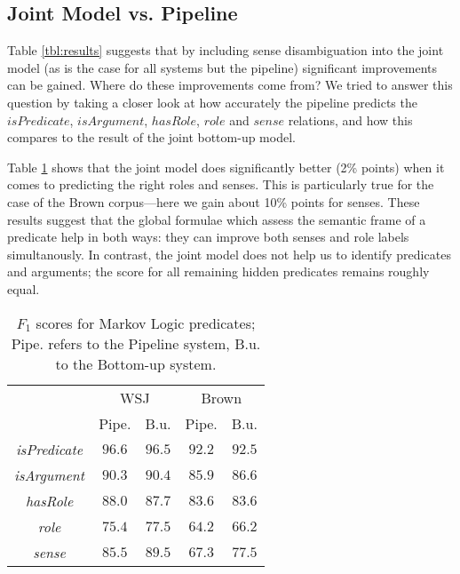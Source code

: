 \subsection{Joint Model vs. Pipeline}
Table \ref{tbl:results} suggests that by including sense disambiguation into the joint model (as is the case for all systems but the pipeline) significant improvements can be gained. Where do these improvements come from? We tried to answer this question by taking a closer look at how accurately the pipeline predicts the $isPredicate$, $isArgument$, $hasRole$, $role$ and $sense$ relations, and how this compares to the result of the joint bottom-up model.

Table \ref{tbl:predicates} shows that the joint model does significantly better (2\% points) when it comes to predicting the right roles and senses. This is particularly true for the case of the Brown corpus---here we gain about 10\% points for senses. These results suggest that the global formulae which assess the semantic frame of a predicate help in both ways: they can improve both senses and role labels simultanously. In contrast, the joint model does not help us to identify predicates and arguments; the score for all remaining hidden predicates remains roughly equal. 


\begin{table}[ht]

    \centering
    \begin{tabular}{|c|c|c|c|c|}\hline
      & \multicolumn{2}{c|}{WSJ} & \multicolumn{2}{c|}{Brown}\\
                                  & Pipe.  &  B.u.   & Pipe.  &  B.u. \\\hline 
        \emph{isPredicate}        & $96.6$ & $96.5$ & $92.2$  & $92.5$\\
        \emph{isArgument}         & $90.3$ & $90.4$ & $85.9$ & $86.6$ \\
        \emph{hasRole}            & $88.0$ & $87.7$ & $83.6$ & $83.6$ \\
        \emph{role}               & $75.4$ & $77.5$ & $64.2$ & $66.2$ \\
        \emph{sense}              & $85.5$ & $89.5$ & $67.3$ & $77.5$ \\\hline
    \end{tabular}
    \caption{$F_1$ scores for Markov Logic predicates; Pipe. refers to the Pipeline system, B.u. to the Bottom-up system.}
    \label{tbl:predicates}
\end{table}


